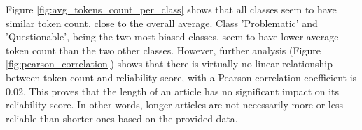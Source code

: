 Figure \ref{fig:avg_tokens_count_per_class} shows that all classes seem to have similar token count, close to the overall average. Class 'Problematic' and 'Questionable', being the two most biased classes, seem to have lower average token count than the two other classes. However, further analysis (Figure \ref{fig:pearson_correlation}) shows that there is virtually no linear relationship between token count and reliability score, with a Pearson correlation coefficient is 0.02. This proves that the length of an article has no significant impact on its reliability score. In other words, longer articles are not necessarily more or less reliable than shorter ones based on the provided data.

